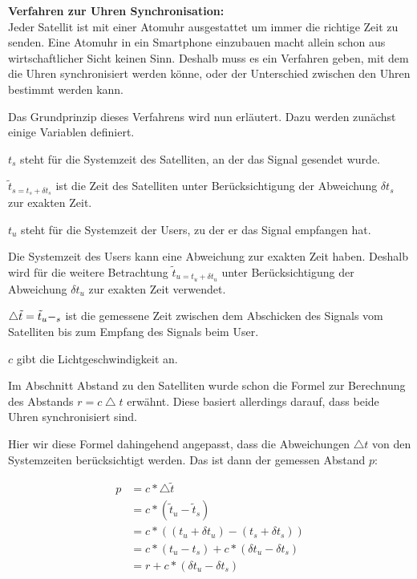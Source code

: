 \textbf{Verfahren zur Uhren Synchronisation:}\\

Jeder Satellit ist mit einer Atomuhr ausgestattet um immer die richtige Zeit zu senden. Eine Atomuhr in ein Smartphone einzubauen macht allein schon aus wirtschaftlicher Sicht keinen Sinn. Deshalb muss es ein Verfahren geben, mit dem die Uhren synchronisiert werden könne, oder der Unterschied zwischen den Uhren bestimmt werden kann.
\cite[S.189]{Schiller2004}

Das Grundprinzip dieses Verfahrens wird nun erläutert. Dazu werden zunächst einige Variablen definiert.

$ t_{s} $ steht für die Systemzeit des Satelliten, an der das Signal gesendet wurde.

$ \tilde{t}_{s = t_{s} + \delta t_{s}} $ ist die Zeit des Satelliten unter Berücksichtigung der Abweichung $ \delta t_{s} $ zur exakten Zeit.

$ t_{u} $ steht für die Systemzeit der Users, zu der er das Signal empfangen hat.

Die Systemzeit des Users kann eine Abweichung zur exakten Zeit haben. Deshalb wird für die weitere Betrachtung $ \tilde{t}_{u = t_{u} + \delta t_{u}} $ unter Berücksichtigung der Abweichung $ \delta t_{u} $ zur exakten Zeit verwendet.

$ \bigtriangleup \tilde{t} = \tilde{t}_{u} - \title{t}_{s} $ ist die gemessene Zeit zwischen dem Abschicken des Signals vom Satelliten bis zum Empfang des Signals beim User.

$ c $ gibt die Lichtgeschwindigkeit an.

Im Abschnitt \glqq Abstand zu den Satelliten \grqq wurde schon die Formel zur Berechnung des Abstands $ r = c \bigtriangleup t $ erwähnt. Diese basiert allerdings darauf, dass beide Uhren synchronisiert sind.

Hier wir diese Formel dahingehend angepasst, dass die Abweichungen $\bigtriangleup t$ von den Systemzeiten berücksichtigt werden. Das ist dann der gemessen Abstand $p$:

\grqq \cite[S. 189 - 190]{Schiller2004}

\glqq 
\begin{align}
p &= c * \bigtriangleup \tilde{t} \\
  &= c * (\tilde{t}_{u} - \tilde{t}_{s}) \\
  &= c * ((t_{u} + \delta t_{u}) - (t_{s} + \delta t_{s})) \\
  &= c * (t_{u} - t_{s}) + c * (\delta t_{u} - \delta t_{s}) \\
  &= r + c * (\delta t_{u} - \delta t_{s})
\end{align}
\grqq \cite[S. 190]{Schiller2004}

